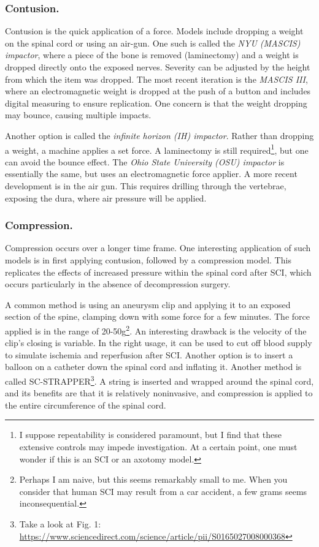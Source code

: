 \documentclass[12pt]{report}
\begin{document}
\subsubsection{Contusion.}
Contusion is the quick application of a force. Models include dropping a weight on the spinal cord or using an air-gun. One such is called the \textit{NYU (MASCIS) impactor}, where a piece of the bone is removed (laminectomy) and a weight is dropped directly onto the exposed nerves. Severity can be adjusted by the height from which the item was dropped. The most recent iteration is the \textit{MASCIS III}, where an electromagnetic weight is dropped at the push of a button and includes digital measuring to ensure replication. One concern is that the weight dropping may bounce, causing multiple impacts.\newline

Another option is called the \textit{infinite horizon (IH) impactor}. Rather than dropping a weight, a machine applies a set force. A laminectomy is still required\footnote{I suppose repeatability is considered paramount, but I find that these extensive controls may impede investigation. At a certain point, one must wonder if this is an SCI or an axotomy model.}, but one can avoid the bounce effect. The \textit{Ohio State University (OSU) impactor} is essentially the same, but uses an electromagnetic force applier. A more recent development is in the air gun. This requires drilling through the vertebrae, exposing the dura, where air pressure will be applied. 


\subsubsection{Compression.}
Compression occurs over a longer time frame. One interesting application of such models is in first applying contusion, followed by a compression model. This replicates the effects of increased pressure within the spinal cord after SCI, which occurs particularly in the absence of decompression surgery.\newline

A common method is using an aneurysm clip and applying it to an exposed section of the spine, clamping down with some force for a few minutes. The force applied is in the range of 20-50g\footnote{Perhaps I am naive, but this seems remarkably small to me. When you consider that human SCI may result from a car accident, a few grams seems inconsequential.}. An interesting drawback is the velocity of the clip's closing is variable. In the right usage, it can be used to cut off blood supply to simulate ischemia and reperfusion after SCI. Another option is to insert a balloon on a catheter down the spinal cord and inflating it. Another method is called SC-STRAPPER\footnote{Take a look at Fig. 1: \url{https://www.sciencedirect.com/science/article/pii/S0165027008000368} }. A string is inserted and wrapped around the spinal cord, and its benefits are that it is relatively noninvasive, and compression is applied to the entire circumference of the spinal cord. 
\end{document}
